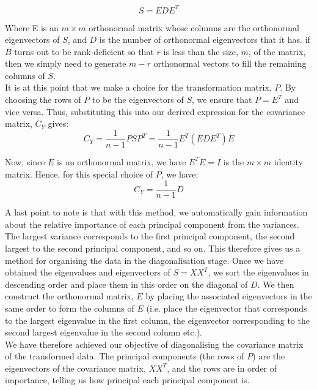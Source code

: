 \begin{appendix}
\begin{equation*}
S=EDE^{T}
\end{equation*} 

Where E is an $m \times m$ orthonormal matrix whose columns are the orthonormal eigenvectors of $S$, and $D$ is the number of orthonormal eigenvectors that it has. if $B$ turns out to be rank-deficient so that $r$ is less than the size, $m$, of the matrix, then we simply need to generate $m-r$ orthonormal vectors to fill the remaining columns of $S$.\\
 
It is at this point that we make a choice for the transformation matrix, $P$. By choosing the rows of $P$ to be the eigenvectors of $S$, we ensure that $P=E^{T}$ and vice versa. Thus, substituting this into our derived expression for the covariance matrix, $C_Y$ gives:\\
\begin{equation*}
C_{Y} = \dfrac{1}{n-1}PSP^{T}=\dfrac{1}{n-1}E^{T}(EDE^{T})E
\end{equation*}

Now, since $E$ is an orthonormal matrix, we have $E^{T}E=I$ is the $m \times m$ identity matrix. Hence, for this special choice of $P$, we have:\\
\begin{equation*}
C_{Y}=\dfrac{1}{n-1}D
\end{equation*} 

A last point to note is that with this method, we automatically gain information about the relative importance of each principal component from the variances. The largest variance corresponds to the first principal component, the second largest to the second principal component, and so on. This therefore gives us a method for organising the data in the diagonalisation stage. Once we have obtained the eigenvalues and eigenvectors of $S = XX^{T}$, we sort the eigenvalues in descending order and place them in this order on the diagonal of $D$. We then construct the orthonormal matrix, $E$ by placing the associated eigenvectors in the same order to form the columns of $E$ (i.e. place the eigenvector that corresponds to the largest eigenvalue in the first column, the eigenvector corresponding to the second largest eigenvalue in the second column etc.).\\

We have therefore achieved our objective of diagonalising the covariance matrix of the
transformed data. The principal components (the rows of $P$) are the eigenvectors of the covariance matrix, $XX^{T}$, and the rows are in order of importance, telling us how principal each principal component is.

\end{appendix}